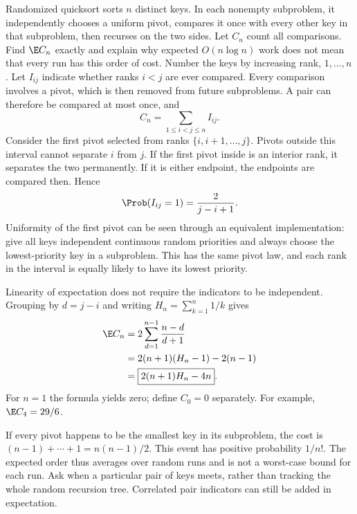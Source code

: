 Randomized quicksort sorts $n$ distinct keys. In each nonempty subproblem, it independently chooses a uniform pivot, compares it once with every other key in that subproblem, then recurses on the two sides. Let $C_n$ count all comparisons. Find $\E C_n$ exactly and explain why expected $O(n\log n)$ work does not mean that every run has this order of cost.
\solution Number the keys by increasing rank, $1,\ldots,n$. Let $I_{ij}$ indicate whether ranks $i<j$ are ever compared. Every comparison involves a pivot, which is then removed from future subproblems. A pair can therefore be compared at most once, and
\[
C_n=\sum_{1\le i<j\le n}I_{ij}.
\]
Consider the first pivot selected from ranks $\{i,i+1,\ldots,j\}$. Pivots outside this interval cannot separate $i$ from $j$. If the first pivot inside is an interior rank, it separates the two permanently. If it is either endpoint, the endpoints are compared then. Hence
\[
\Prob(I_{ij}=1)=\frac2{j-i+1}.
\]
Uniformity of the first pivot can be seen through an equivalent implementation: give all keys independent continuous random priorities and always choose the lowest-priority key in a subproblem. This has the same pivot law, and each rank in the interval is equally likely to have its lowest priority.

Linearity of expectation does not require the indicators to be independent. Grouping by $d=j-i$ and writing $H_n=\sum_{k=1}^n1/k$ gives
\[
\begin{aligned}
\E C_n
&=2\sum_{d=1}^{n-1}\frac{n-d}{d+1}\\
&=2(n+1)(H_n-1)-2(n-1)\\
&=\boxed{2(n+1)H_n-4n}.
\end{aligned}
\]
For $n=1$ the formula yields zero; define $C_0=0$ separately. For example, $\E C_4=29/6$.

If every pivot happens to be the smallest key in its subproblem, the cost is $(n-1)+\cdots+1=n(n-1)/2$. This event has positive probability $1/n!$. The expected order thus averages over random runs and is not a worst-case bound for each run.
\insight Ask when a particular pair of keys meets, rather than tracking the whole random recursion tree. Correlated pair indicators can still be added in expectation.

